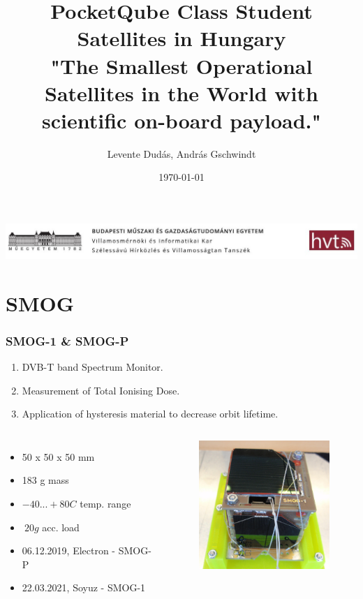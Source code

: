 \documentclass{beamer}
\title[SMOG-1]
{
	\color{red} PocketQube Class Student Satellites in Hungary\\
	\medskip
	\normalsize \color{dg} "The Smallest Operational Satellites in the World with scientific on-board payload."
}
\author{Levente Dudás, András Gschwindt}
\institute[BME VIK SzHVT]{
	\medskip
	\color{purple} \normalsize \textit{dudas.levente@vik.bme.hu}\\
	\medskip
	\large \color{blue}\url{https://gnd.bme.hu}
}
\date{\today}
\begin{document}
\newcommand{\slidetime}{60}

\begin{frame}
\transduration{\slidetime}
\begin{center}
\includegraphics[width=1.0\textwidth]{hvt.jpg}
\end{center}
\titlepage
\end{frame}

\section{SMOG}
\begin{frame}
\transduration{\slidetime}
\frametitle{SMOG-1 \& SMOG-P}
\begin{enumerate}
\item DVB-T band Spectrum Monitor.
\item Measurement of Total Ionising Dose.
\item Application of hysteresis material to decrease orbit lifetime.
\end{enumerate}


\begin{columns}
\begin{itemize}
	\item 50 x 50 x 50 mm
	\item 183 g mass
	\item $-40 ... +80 C$ temp. range
	\item $~20 g$ acc. load
	\vspace{3mm}
	\item 06.12.2019, Electron - SMOG-P
	\item 22.03.2021, Soyuz - SMOG-1
\end{itemize}
\begin{figure}
\includegraphics[width=50mm]{P9060082.JPG}
\end{figure}
\end{columns}
\end{frame}
\end{document}
